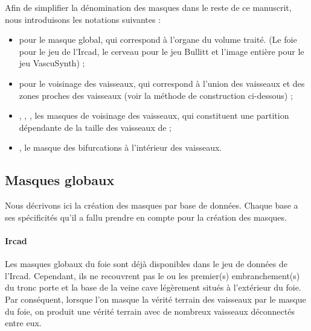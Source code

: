 Afin de simplifier la dénomination des masques dans le reste de ce manuscrit, nous introduisons les notations suivantes :

\begin{itemize}
  \item \maskglobal pour le masque global, qui correspond à l'organe du volume traité. (Le foie pour le jeu de l'Ircad, le cerveau pour le jeu Bullitt et l'image entière pour le jeu VascuSynth) ;
  \item \maskvascular pour le voisinage des vaisseaux, qui correspond à l'union des vaisseaux et des zones proches des vaisseaux (voir la méthode de construction ci-dessous) ;
  \item \maskvesselLarge, \maskvesselMedium, \maskvesselSmall, les masques de voisinage des vaisseaux, qui constituent une partition dépendante de la taille des vaisseaux de \maskvascular;
  \item \maskbif, le masque des bifurcations à l'intérieur des vaisseaux.
  \end{itemize}

\subsection{Masques globaux}

Nous décrivons ici la création des masques par base de données. Chaque base a ses spécificités qu'il a fallu prendre en compte pour la création des masques.

\paragraph{Ircad}
Les masques globaux du foie sont déjà disponibles dans le jeu de données de l'Ircad. Cependant, ils ne recouvrent pas le ou les premier(s) embranchement(s) du tronc porte et la base de la veine cave légèrement situés à l'extérieur du foie. Par conséquent, lorsque l'on masque la vérité terrain des vaisseaux par le masque du foie, on produit une vérité terrain avec de nombreux vaisseaux déconnectés entre eux. 


